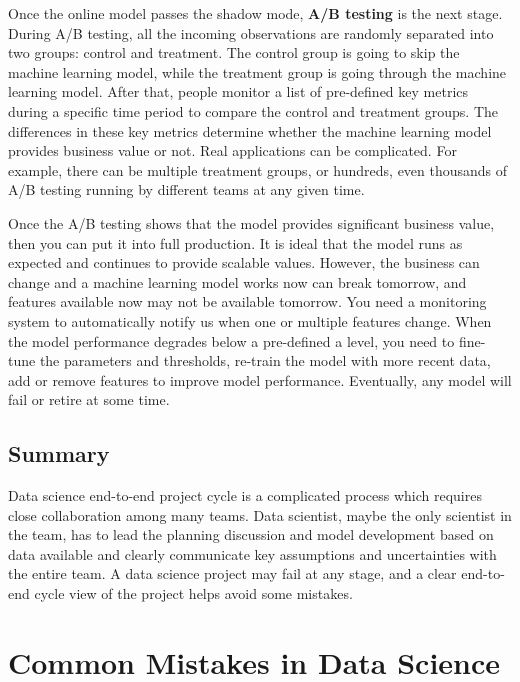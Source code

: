 \documentclass[12pt,]{krantz}
\begin{document}
Once the online model passes the shadow mode, \textbf{A/B testing} is the next stage. During A/B testing, all the incoming observations are randomly separated into two groups: control and treatment. The control group is going to skip the machine learning model, while the treatment group is going through the machine learning model. After that, people monitor a list of pre-defined key metrics during a specific time period to compare the control and treatment groups. The differences in these key metrics determine whether the machine learning model provides business value or not. Real applications can be complicated. For example, there can be multiple treatment groups, or hundreds, even thousands of A/B testing running by different teams at any given time.

Once the A/B testing shows that the model provides significant business value, then you can put it into full production. It is ideal that the model runs as expected and continues to provide scalable values. However, the business can change and a machine learning model works now can break tomorrow, and features available now may not be available tomorrow. You need a monitoring system to automatically notify us when one or multiple features change. When the model performance degrades below a pre-defined a level, you need to fine-tune the parameters and thresholds, re-train the model with more recent data, add or remove features to improve model performance. Eventually, any model will fail or retire at some time.

\hypertarget{summary}{%
\subsection{Summary}\label{summary}}

Data science end-to-end project cycle is a complicated process which requires close collaboration among many teams. Data scientist, maybe the only scientist in the team, has to lead the planning discussion and model development based on data available and clearly communicate key assumptions and uncertainties with the entire team. A data science project may fail at any stage, and a clear end-to-end cycle view of the project helps avoid some mistakes.

\hypertarget{common-mistakes-in-data-science}{%
\section{Common Mistakes in Data Science}\label{common-mistakes-in-data-science}}
\end{document}
